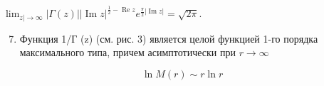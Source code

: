 \documentclass[10pt]{article}
\begin{document}
$\lim _{z \mid \rightarrow \infty}|\Gamma(z)||\operatorname{Im} z|^{\frac{1}{2}-\operatorname{Re} z} e^{\frac{\pi}{2}|\operatorname{Im} z|}=\sqrt{2 \pi}$.



\begin{enumerate}

  \setcounter{enumi}{6}

  \item Функция 1/Г (z) (см. рис. 3) является целой функцией 1-го порядка максимального типа, причем асимптотически при $r \rightarrow \infty$

\end{enumerate}



\[

\ln M(r) \sim r \ln r

\]
\end{document}
